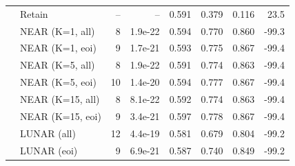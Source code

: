 \begin{table}[t]
\begin{tabular}{llrrrrrr}
 & Retain & -- & -- & 0.591 & 0.379 & 0.116 & 23.5 \\
 & NEAR (K=1, all) & 8 & 1.9e-22 & 0.594 & 0.770 & 0.860 & -99.3 \\
 & NEAR (K=1, eoi) & 9 & 1.7e-21 & 0.593 & 0.775 & 0.867 & -99.4 \\
 & NEAR (K=5, all) & 8 & 1.9e-22 & 0.591 & 0.774 & 0.863 & -99.4 \\
 & NEAR (K=5, eoi) & 10 & 1.4e-20 & 0.594 & 0.777 & 0.867 & -99.4 \\
 & NEAR (K=15, all) & 8 & 8.1e-22 & 0.592 & 0.774 & 0.863 & -99.4 \\
 & NEAR (K=15, eoi) & 9 & 3.4e-21 & 0.597 & 0.778 & 0.867 & -99.4 \\
 & LUNAR (all) & 12 & 4.4e-19 & 0.581 & 0.679 & 0.804 & -99.2 \\
 & LUNAR (eoi) & 9 & 6.9e-21 & 0.587 & 0.740 & 0.849 & -99.2 \\
\bottomrule
\end{tabular}
\label{tab:tofu-Llama-3.2-1B-Instruct}
\end{table}
